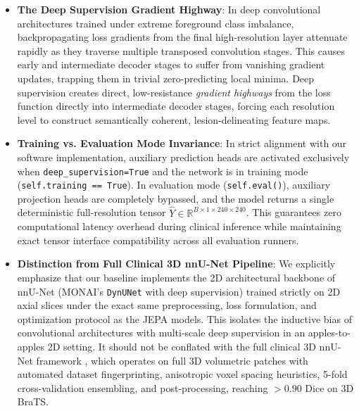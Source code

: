 \documentclass{article}
\begin{document}
\begin{itemize}
    The multi-scale loss is computed using normalized exponential decay weights:
    \begin{equation}
        \mathcal{L}_{\text{deep\_sup}} = \sum_{s=1}^S w_s \cdot \left[ \mathcal{L}_{\text{Dice}}(\hat{Y}_s, Y_s) + \mathcal{L}_{\text{BCE}}(\hat{Y}_s, Y_s) \right], \qquad w_s = \frac{2^{-(s-1)}}{\sum_{j=1}^S 2^{-(j-1)}}
    \end{equation}
    For $S = 4$ stages, the raw weights $(1.0, 0.5, 0.25, 0.125)$ sum to $1.875$, yielding normalized weights $(0.533, 0.267, 0.133, 0.067)$. Normalizing weights ensures that the effective gradient scale remains identical to single-resolution training, preventing learning rate instability.
    \item \textbf{The Deep Supervision Gradient Highway}: In deep convolutional architectures trained under extreme foreground class imbalance, backpropagating loss gradients from the final high-resolution layer attenuate rapidly as they traverse multiple transposed convolution stages. This causes early and intermediate decoder stages to suffer from vanishing gradient updates, trapping them in trivial zero-predicting local minima. Deep supervision creates direct, low-resistance \emph{gradient highways} from the loss function directly into intermediate decoder stages, forcing each resolution level to construct semantically coherent, lesion-delineating feature maps.
    \item \textbf{Training vs. Evaluation Mode Invariance}: In strict alignment with our software implementation, auxiliary prediction heads are activated exclusively when \texttt{deep\_supervision=True} and the network is in training mode (\texttt{self.training == True}). In evaluation mode (\texttt{self.eval()}), auxiliary projection heads are completely bypassed, and the model returns a single deterministic full-resolution tensor $\hat{Y} \in \mathbb{R}^{B \times 1 \times 240 \times 240}$. This guarantees zero computational latency overhead during clinical inference while maintaining exact tensor interface compatibility across all evaluation runners.
    \item \textbf{Distinction from Full Clinical 3D nnU-Net Pipeline}: We explicitly emphasize that our baseline implements the 2D architectural backbone of nnU-Net (MONAI's \texttt{DynUNet} with deep supervision) trained strictly on 2D axial slices under the exact same preprocessing, loss formulation, and optimization protocol as the JEPA models. This isolates the inductive bias of convolutional architectures with multi-scale deep supervision in an apples-to-apples 2D setting. It should not be conflated with the full clinical 3D nnU-Net framework \citep{isensee2021nnunet}, which operates on full 3D volumetric patches with automated dataset fingerprinting, anisotropic voxel spacing heuristics, 5-fold cross-validation ensembling, and post-processing, reaching $>0.90$ Dice on 3D BraTS.
\end{itemize}
\end{document}
